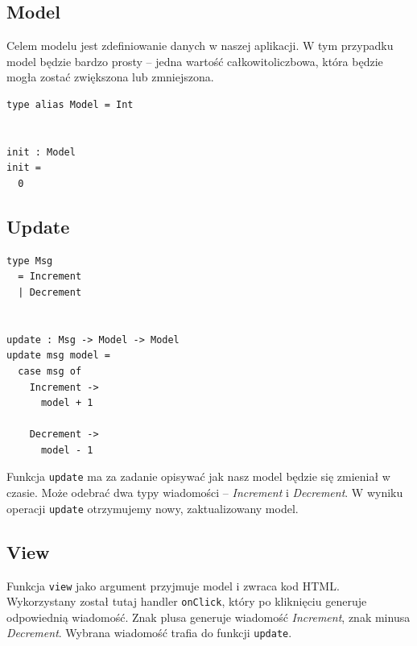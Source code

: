 \documentclass[twoside,a4paper]{report}
\begin{document}
\subsection{Model}
\begin{minipage}{.50\textwidth}
    Celem modelu jest zdefiniowanie danych w naszej aplikacji.
    W tym przypadku model będzie bardzo prosty -- jedna wartość całkowitoliczbowa, która będzie mogła zostać zwiększona lub zmniejszona.
\end{minipage}\hfill
\begin{minipage}{.45\textwidth}
    \lstset{frame=single}
    \begin{lstlisting}[caption={\textit{The Elm Architecture} - Model},label=kod:Model]
type alias Model = Int


init : Model
init =
  0
    \end{lstlisting}
\end{minipage}\hfill

\subsection{Update}
\begin{minipage}{.45\textwidth}
    \lstset{frame=single}
    \begin{lstlisting}[caption={\textit{The Elm Architecture} - Update},label=kod:Update]
type Msg
  = Increment
  | Decrement


update : Msg -> Model -> Model
update msg model =
  case msg of
    Increment ->
      model + 1

    Decrement ->
      model - 1
    \end{lstlisting}
\end{minipage}\hfill
\begin{minipage}{.50\textwidth}
    Funkcja \verb|update| ma za zadanie opisywać jak nasz model będzie się zmieniał w czasie.
    Może odebrać dwa typy wiadomości -- \textit{Increment} i \textit{Decrement}.
    W wyniku operacji \verb|update| otrzymujemy nowy, zaktualizowany model.
\end{minipage}\hfill
\subsection{View}
Funkcja \verb|view| jako argument przyjmuje model i zwraca kod HTML\@.
Wykorzystany został tutaj handler \verb|onClick|, który po kliknięciu generuje odpowiednią wiadomość.
Znak plusa generuje wiadomość \textit{Increment}, znak minusa \textit{Decrement}.
Wybrana wiadomość trafia do funkcji \verb|update|.
\end{document}
